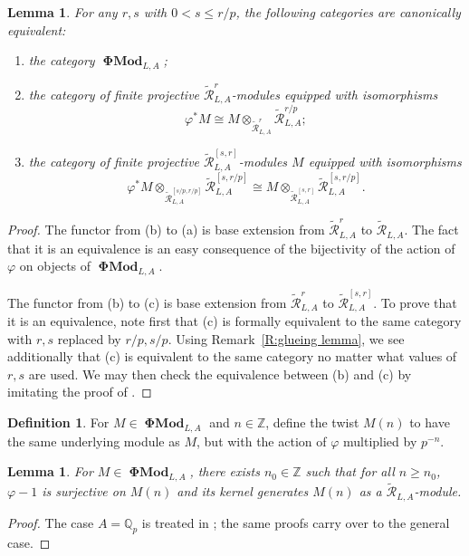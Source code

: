 \documentclass[12pt]{amsart}
\newtheorem{lemma}[theorem]{Lemma}
\theoremstyle{definition}
\newtheorem{defn}[theorem]{Definition}
\numberwithin{equation}{theorem}
\newcommand{\QQ}{\mathbb{Q}}
\newcommand{\ZZ}{\mathbb{Z}}
\newcommand{\calR}{\mathcal{R}}
\DeclareMathOperator{\PhiMod}{\mathbf{\Phi Mod}}
\begin{document}
\begin{lemma} \label{L:phi modules bundles}
For any $r,s$ with $0 < s \leq r/p$, the following categories are canonically equivalent:
\begin{enumerate}
\item[(a)]
the category $\PhiMod_{L,A}$;
\item[(b)]
the category of finite projective $\tilde{\calR}^r_{L,A}$-modules equipped with isomorphisms 
\[
\varphi^* M  \cong 
M \otimes_{\tilde{\calR}^r_{L,A}} \tilde{\calR}^{r/p}_{L,A};
\]
\item[(c)]
the category of finite projective $\tilde{\calR}^{[s,r]}_{L,A}$-modules
$M$ equipped with isomorphisms 
\[
\varphi^* M \otimes_{\tilde{\calR}^{[s/p,r/p]}_{L,A}} \tilde{\calR}^{[s,r/p]}_{L,A} \cong 
M \otimes_{\tilde{\calR}^{[s,r]}_{L,A}} \tilde{\calR}^{[s,r/p]}_{L,A}.
\]
\end{enumerate}
\end{lemma}
\begin{proof}
The functor from (b) to (a) is base extension from $\tilde{\calR}^r_{L,A}$ to $\tilde{\calR}_{L,A}$. The fact that it is an equivalence is an easy consequence of the bijectivity of the action of $\varphi$ on objects of $\PhiMod_{L,A}$.

The functor from (b) to (c) is base extension from $\tilde{\calR}^r_{L,A}$ to $\tilde{\calR}^{[s,r]}_{L,A}$. To prove that it is an equivalence, note first that (c) is formally equivalent to the same category with $r,s$ replaced by $r/p,s/p$. Using 
	Remark~\ref{R:glueing lemma}, we see additionally that (c) is equivalent to the same category no matter what values of $r,s$ are used. We may then check the equivalence between (b) and (c) by imitating the proof of \cite[Proposition~2.2.7]{kpx}.
\end{proof}

\begin{defn}
For $M \in \PhiMod_{L,A}$ and $n \in \ZZ$, define the twist $M(n)$ to have the same underlying module as $M$, but with the action of $\varphi$ multiplied by $p^{-n}$.
\end{defn}

\begin{lemma} \label{L:enough phi-invariants}
For $M \in \PhiMod_{L,A}$, there exists $n_0 \in \ZZ$ such that for all $n \geq n_0$,
$\varphi-1$ is surjective on $M(n)$ and its kernel generates $M(n)$ as a $\tilde{\calR}_{L,A}$-module.
\end{lemma}
\begin{proof}
The case $A = \QQ_p$ is treated in \cite[Proposition~6.2.2, Proposition~6.2.4]{kedlaya-liu1}; the same proofs carry over to the general case.
\end{proof}
\end{document}
